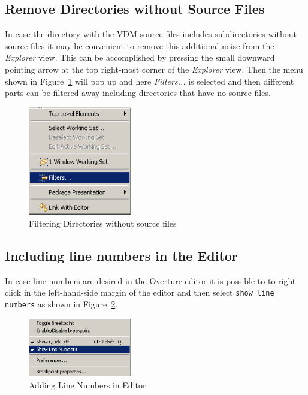 \documentclass{overturerepchap}
\begin{document}
\subsection{Remove Directories without Source Files}

In case the directory with the VDM source files includes
subdirectories without source files it may be convenient to remove
this additional noise from the \emph{Explorer} view. This can be
accomplished by pressing the small downward pointing arrow at the top
right-most corner of the \emph{Explorer} view. Then the menu shown in
Figure~\ref{fig:filteringfiles} will pop up and here \emph{Filters...}
is selected and then different parts can be filtered away including
directories that have no source files.

\begin{figure}[!htb]
\begin{center}
\includegraphics[width=0.4\textwidth]{screenDumps/filteringfiles}
\caption{Filtering Directories without source files\label{fig:filteringfiles}}
\end{center}
\end{figure}

\subsection{Including line numbers in the Editor}

In case line numbers are desired in the Overture
editor it is possible to to right click in the left-hand-side margin
of the editor and then select \texttt{show line numbers} as shown in
Figure~\ref{fig:linenumbers}. 

\begin{figure}[!htb]
\begin{center}
\includegraphics[width=0.4\textwidth]{screenDumps/linenumbers}
\caption{Adding Line Numbers in Editor\label{fig:linenumbers}}
\end{center}
\end{figure}
\end{document}
